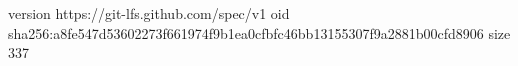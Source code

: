 version https://git-lfs.github.com/spec/v1
oid sha256:a8fe547d53602273f661974f9b1ea0cfbfc46bb13155307f9a2881b00cfd8906
size 337
